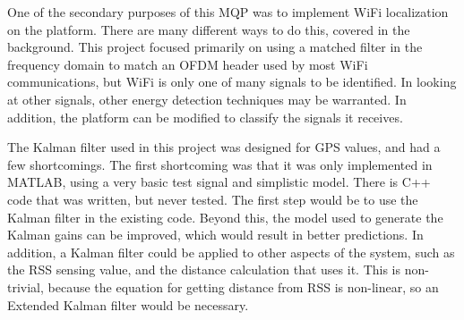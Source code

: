 One of the secondary purposes of this MQP was to implement WiFi localization on 
the platform. There are many different ways to do this, covered in the background.
This project focused primarily on using a matched filter in the frequency domain to match
an OFDM header used by most WiFi communications, but WiFi is only one of many 
signals to be identified. In looking at other signals, other energy detection
techniques may be warranted. In addition, the platform can be modified to 
classify the signals it receives.\par

The Kalman filter used in this project was designed for GPS values, and had a few shortcomings.
The first shortcoming was that it was only implemented in MATLAB, using a very basic
test signal and simplistic model. There is C++ code that was written, but never tested.
The first step would be to use the Kalman filter in the existing code. Beyond this,
the model used to generate the Kalman gains can be improved, which would result in better 
predictions. In addition, a Kalman filter could be applied to other aspects of the 
system, such as the RSS sensing value, and the distance calculation that uses it.
This is non-trivial, because the equation for getting distance from RSS is non-linear,
so an Extended Kalman filter would be necessary. 

